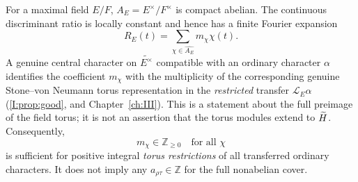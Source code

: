 For a maximal field $E/F$, $A_E=E^\times/F^\times$ is compact
abelian.  The continuous discriminant ratio is locally constant and
hence has a finite Fourier expansion
\begin{equation}\label{IV:eq:R-Fourier}
R_E(t)=\sum_{\chi\in\widehat{A_E}}m_\chi\chi(t).
\end{equation}
A genuine central character on $\widetilde{E^\times}$ compatible
with an ordinary character $\alpha$ identifies the coefficient
$m_\chi$ with the multiplicity of the corresponding genuine
Stone--von Neumann torus representation in the \emph{restricted}
transfer $\mathcal L_E\alpha$ (\cref{I:prop:good},
and Chapter~\ref{ch:III}).  This is a statement about the full preimage
of the field torus; it is not an assertion that the torus modules
extend to $\widetilde H$.  Consequently,
\begin{equation}\label{IV:eq:toralnecessary}
 m_\chi\in\mathbb Z_{\ge0}\quad\text{for all $\chi$}
\end{equation}
is sufficient for positive integral \emph{torus restrictions} of
all transferred ordinary characters.  It does not imply any
$a_{\rho\tau}\in\mathbb Z$ for the full nonabelian cover.

